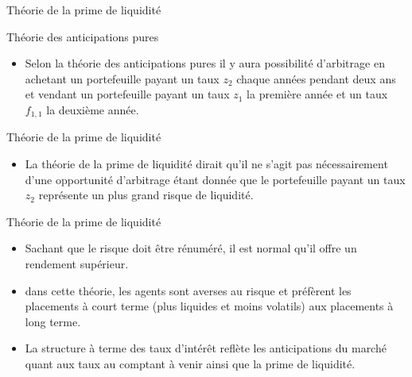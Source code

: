 \documentclass{beamer}
\begin{document}
\begin{frame}{Théorie de la prime de liquidité}
\begin{block}{Théorie des anticipations pures}
\begin{itemize}
\item Selon la théorie des anticipations pures  il y aura possibilité d'arbitrage en achetant un portefeuille payant un taux $z_2$ chaque années pendant deux ans et vendant un portefeuille payant un taux $z_1$ la première année et un taux $f_{1,1}$ la deuxième année. 
\end{itemize}
\end{block}
\begin{block}{Théorie de la prime de liquidité}
\begin{itemize}
\item La théorie de la prime de liquidité dirait qu'il ne s'agit pas nécessairement d'une opportunité d'arbitrage étant donnée que le portefeuille payant un taux $z_2$ représente un plus grand risque de liquidité. 
\end{itemize}
\end{block}
\end{frame}

\begin{frame}{Théorie de la prime de liquidité}
\begin{itemize}
\item Sachant que le risque doit être rénuméré,  il est normal qu'il offre un rendement supérieur.  
\item dans cette théorie,  les agents sont averses au risque et préfèrent les placements à court terme (plus liquides et moins volatils) aux placements à long terme. 
\item La structure à terme des taux d’intérêt reflète les anticipations du marché quant aux taux au comptant à venir ainsi que la prime de liquidité.
\end{itemize}
\end{frame}
\end{document}

